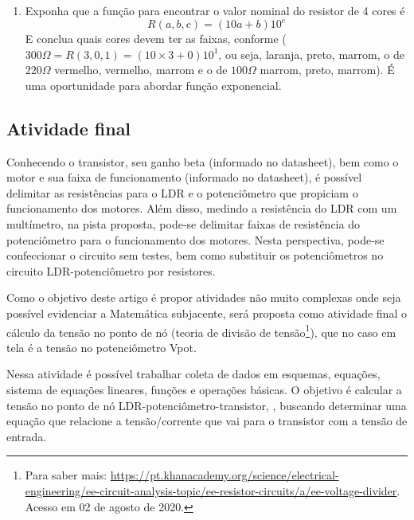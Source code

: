 \documentclass{textolivre-html}
\begin{document}
\begin{enumerate}
\item Exponha que a função para encontrar o valor nominal do resistor de 4 cores é
\begin{equation*}
R(a,b,c) = (10a + b)10^c
\end{equation*}
E conclua quais cores devem ter as faixas, conforme  ($300\Omega =
R(3,0,1)= (10 \times 3+0)10^1$, ou seja, laranja, preto, marrom, o de
$220\Omega$ vermelho, vermelho, marrom e o de $100\Omega$ marrom, preto,
marrom). É uma oportunidade para abordar função exponencial.




\end{enumerate}




\subsection{Atividade final}\label{sec-atv-final}
Conhecendo o transistor, seu ganho beta (informado no datasheet), bem como o
motor e sua faixa de funcionamento (informado no datasheet), é possível
delimitar as resistências para o LDR e o potenciômetro que propiciam o
funcionamento dos motores. Além disso, medindo a resistência do LDR com um
multímetro, na pista proposta, pode-se delimitar faixas de resistência do
potenciômetro para o funcionamento dos motores. Nesta perspectiva, pode-se
confeccionar o circuito sem testes, bem como substituir os potenciômetros no
circuito LDR-potenciômetro por resistores. 

Como o objetivo deste artigo é propor atividades não muito complexas onde seja
possível evidenciar a Matemática subjacente, será proposta como atividade final
o cálculo da tensão no ponto de nó (teoria de divisão de tensão\footnote{Para
saber mais:
\url{https://pt.khanacademy.org/science/electrical-engineering/ee-circuit-analysis-topic/ee-resistor-circuits/a/ee-voltage-divider}.
Acesso em 02 de agosto de 2020.}), que no caso em tela é a tensão no
potenciômetro Vpot.

Nessa atividade é possível trabalhar coleta de dados em esquemas, equações,
sistema de equações lineares, funções e operações básicas. O objetivo é
calcular a tensão no ponto de nó LDR-potenciômetro-transistor, ,
buscando determinar uma equação que relacione a tensão/corrente que vai para o
transistor com a tensão de entrada.
\end{document}
